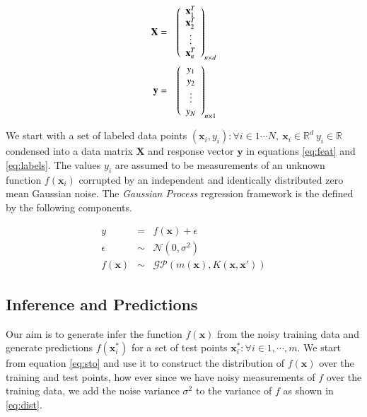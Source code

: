 \documentclass[referee,a4paper,12pt,traditabstract]{swsc}
\begin{document}
\begin{linenumbers}
\begin{eqnarray}
  \mathbf{X} & = & \left( \begin{array}{c} \mathbf{x}^{T}_1 \\ \mathbf{x}^{T}_2 \\ \vdots \\ \mathbf{x}^{T}_n \end{array} \right)_{n \times d} \label{eq:feat} \\
  \vspace{2\baselineskip}
  \mathbf{y} & = & \left( \begin{array}{c} y_1 \\ y_2 \\ \vdots \\ y_N \end{array} \right) _{n \times 1} \label{eq:labels}
\end{eqnarray}

We start with a set of labeled data points $ {(\mathbf{x}_i, y_i): \forall i \in 1 \cdots N, \ \mathbf{x}_i \in \mathbb{R}^d \ y_i \in \mathbb{R}} $ condensed into a data matrix $\mathbf{X}$ and response vector $\mathbf{y}$ in equations \ref{eq:feat} and \ref{eq:labels}. The values $y_i$ are assumed to be measurements of an unknown function $f(\mathbf{x}_i)$ corrupted by an independent and identically distributed zero mean Gaussian noise. The \emph{Gaussian Process} regression framework is the defined by the following components.

\begin{eqnarray}
      y & = & f(\mathbf{x}) + \epsilon  \\
      \epsilon & \sim & \mathcal{N}(0, \sigma^2) \\
      f(\mathbf{x}) & \sim & \mathcal{GP}(m(\mathbf{x}), K(\mathbf{x},\mathbf{x}')) 
\end{eqnarray}


\subsection{Inference and Predictions}

Our aim is to generate infer the function $f(\mathbf{x})$ from the noisy training data and generate predictions $f(\mathbf{x}^{*}_i)$ for a set of test points $ {\mathbf{x}^{*}_i : \forall i \in 1, \cdots, m} $. We start from equation \ref{eq:sto} and use it to construct the distribution of $f(\mathbf{x})$ over the training and test points, how ever since we have noisy measurements of $f$ over the training data, we add the noise variance $\sigma^2$ to the variance of $f$ as shown in \ref{eq:dist}.


\end{linenumbers}
\end{document}
